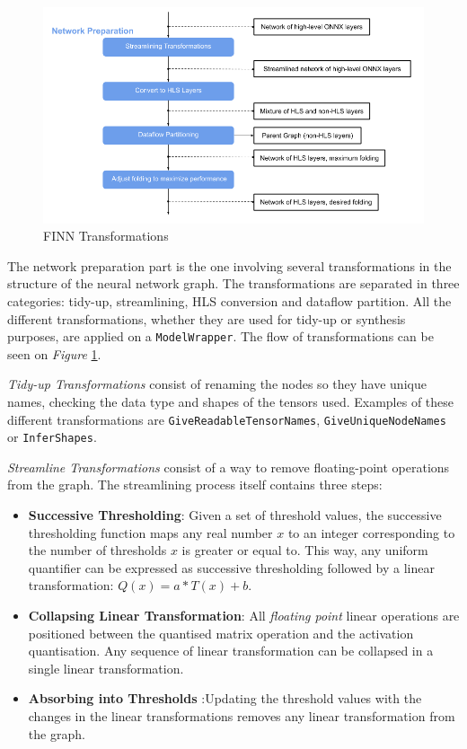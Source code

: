 \begin{figure}[htbp]
	\centering
		\includegraphics[width=\textwidth]{Figures/FINNTransformations.png}
	\caption[FINN Transformations]{FINN Transformations}
	\label{fig:FINNTransformations}
\end{figure}

The network preparation part is the one involving several transformations in the structure of the neural network graph. The transformations are separated in three categories: tidy-up, streamlining, HLS conversion and dataflow partition. All the different transformations, whether they are used for tidy-up or synthesis purposes, are applied on a \texttt{ModelWrapper}. The flow of transformations can be seen on \emph{Figure} \ref{fig:FINNTransformations}.

\emph{Tidy-up Transformations} consist of renaming the nodes so they have unique names, checking the data type and shapes of the tensors used. Examples of these different transformations are \texttt{GiveReadableTensorNames}, \texttt{GiveUniqueNodeNames} or \texttt{InferShapes}.

\emph{Streamline Transformations} consist of a way to remove floating-point operations from the graph. The streamlining process itself contains three steps:
\begin{itemize}
  \item \textbf{Successive Thresholding}: Given a set of threshold values, the successive thresholding function maps any real number $x$ to an integer corresponding to the number of thresholds $x$ is greater or equal to. This way, any uniform quantifier can be expressed as successive thresholding followed by a linear transformation: $Q(x) = a*T(x) + b$.
  \item \textbf{Collapsing Linear Transformation}: All \emph{floating point} linear operations are positioned between the quantised matrix operation and the activation quantisation. Any sequence of linear transformation can be collapsed in a single linear transformation.
  \item \textbf{Absorbing into Thresholds} :Updating the threshold values with the changes in the linear transformations removes any linear transformation from the graph.
\end{itemize}

